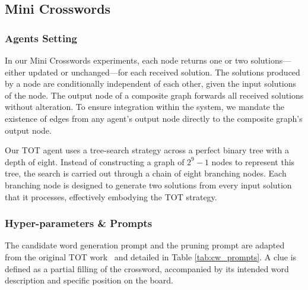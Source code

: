 \documentclass{article}
\theoremstyle{plain}
\theoremstyle{definition}
\theoremstyle{remark}
\begin{document}
\subsection{Mini Crosswords}
\subsubsection{Agents Setting}
In our Mini Crosswords experiments, each node returns one or two solutions—either updated or unchanged—for each received solution.
The solutions produced by a node are conditionally independent of each other, given the input solutions of the node.
The output node of a composite graph forwards all received solutions without alteration.
To ensure integration within the system, we mandate the existence of edges from any agent's output node directly to the composite graph's output node.

Our TOT agent uses a tree-search strategy across a perfect binary tree with a depth of eight.
Instead of constructing a graph of $2^9 - 1$ nodes to represent this tree, the search is carried out through a chain of eight branching nodes.
Each branching node is designed to generate two solutions from every input solution that it processes, effectively embodying the TOT strategy.

\subsubsection{Hyper-parameters \& Prompts}
The candidate word generation prompt and the pruning prompt are adapted from the original TOT work~\citep{yao2023tree} and detailed in Table \ref{tab:cw_prompts}.
A clue is defined as a partial filling of the crossword, accompanied by its intended word description and specific position on the board.
\end{document}
